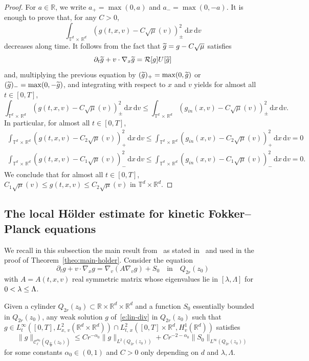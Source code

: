\documentclass[AHL,Unicode,longabstracts,published]{cedram}
\newcommand{\R}{\mathbb{R}}
\newcommand{\T}{\mathbb{T}}
\newcommand{\cC}{\mathcal{C}}
\newcommand*\fR{\mathcal{R}}
\newcommand{\dd}{{\, \mathrm d}}
\let\oldtilde\tilde
\renewcommand*{\tilde}[1]{\mathchoice{\widetilde{#1}}{\widetilde{#1}}{\oldtilde{#1}}{\oldtilde{#1}}}
\begin{document}
\begin{proof}
For $a \in \R$, we write $a_+ = \max (0,a)$ and $a_- =
\max(0,-a)$. It is enough to prove that, for any $C>0$,
\[
\int_{\T^d\,\times\,\R^d} \left(g (t,x,v) - C \sqrt{\mu} (v)\right)^2_\pm \dd x \dd v
\]
decreases along time. It follows from the fact that $\tilde g = g - C\sqrt\mu$ satisfies
\[
\partial_t \tilde g + v \cdot \nabla_x \tilde g = \fR[g] U[\tilde g]
\]
and, multiplying the previous equation by $(\tilde g)_+ = \max (0,\tilde g)$ or $(\tilde g)_- = \max(0,-\tilde g)$, and integrating with respect to $x$ and $v$ yields for almost all $t \in [0,T]$,
\[
\int_{\T^d\,\times\,\R^d} \left(g (t,x,v) - C \sqrt{\mu} (v)\right)^2_\pm \dd x \dd v \le \int_{\T^d\,\times\,\R^d} \left(g_{in} (x,v) - C \sqrt{\mu} (v)\right)^2_\pm \dd x \dd v.
\]
In particular, for almost all $t \in [0,T]$,
\begin{align*}
\int_{\T^d\,\times\,\R^d} \left(g (t,x,v) - C_2 \sqrt{\mu} (v)\right)^2_+ \dd x \dd v \le \int_{\T^d\,\times\,\R^d} \left(g_{in} (x,v) - C_2 \sqrt{\mu} (v)\right)^2_+ \dd x \dd v = 0 \\
\int_{\T^d\,\times\,\R^d} \left(g (t,x,v) - C_1 \sqrt{\mu} (v)\right)^2_- \dd x \dd v \le \int_{\T^d\,\times\,\R^d} \left(g_{in} (x,v) - C_1 \sqrt{\mu} (v)\right)^2_- \dd x \dd v = 0.
\end{align*}
We conclude that for almost all $t \in [0,T]$, $C_1 \sqrt\mu (v) \le g (t,x,v) \le C_2 \sqrt\mu (v)$ in $\T^d \times \R^d$.
\end{proof}

\subsection{The local H\"older estimate for kinetic Fokker--Planck equations}\label{ss:holder}

We recall in this subsection the main result from~\cite{gimv,wz09} as stated in~\cite{gimv} and used in the proof of Theorem~\ref{theo:main-holder}. Consider the equation
\begin{equation}\label{e:lin-div}
\partial_t g + v \cdot \nabla_x g =
\nabla_v(A \nabla_v g) + S_0 \quad \text{in} \quad Q_{2r}(z_0)
\end{equation}
with $A=A(t,x,v)$ real symmetric matrix whose eigenvalues lie in $[\lambda,\Lambda]$ for $0 < \lambda\linebreak\le \Lambda$.

\begin{theo}\label{t:gimv}
Given a cylinder $Q_{2r}(z_0) \subset \R \times \R^d \times \R^d$ and a function $S_0$ essentially bounded in $Q_{2r}(z_0)$, any weak solution $g$ of~\eqref{e:lin-div} in $Q_{2r}(z_0)$ such that $g \in L^\infty_t([0,T], L^2_{x,\,v} (\R^d \times \R^d)) \cap L^2_{t,\,x} ([0,T]
\times \R^d, H^1_v (\R^d))$ satisfies
\[
\| g\|_{\cC_\ell^{{\alpha_0}}\left(Q_{\frac{3r}2}(z_0)\right)} \le C r^{-{\alpha_0}} \| g \|_{L^2\left(Q_{2r}(z_0)\right)} + C r^{-2-{\alpha_0}}
\|S_0\|_{L^\infty\left(Q_{2r}(z_0)\right)}
\]
for some constants $\alpha_0 \in (0,1)$ and $C>0$ only depending on $d$ and $\lambda,\Lambda$.
\end{theo}
\end{document}

